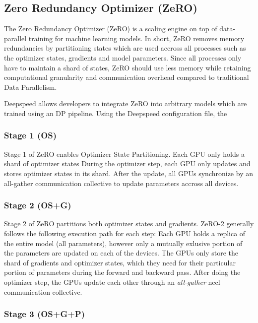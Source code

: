 \subsection{Zero Redundancy Optimizer (ZeRO)}
\label{subsection:zero}

The Zero Redundancy Optimizer (ZeRO) is a scaling engine on top of data-parallel training for 
machine learning models. In short, ZeRO removes memory redundancies by partitioning states which 
are used accross all processes such as the optimizer states, gradients and model parameters. 
Since all processes only have to maintain a shard of states, ZeRO should use less memory while 
retaining computational granularity and communication overhead compared to traditional Data 
Parallelism.

Deepspeed allows developers to integrate ZeRO into arbitrary models which are trained using an 
DP pipeline. Using the Deepspeed configuration file, the 



\subsubsection{Stage 1 (OS)}

Stage 1 of ZeRO enables Optimizer State Partitioning. Each GPU only holds a shard of optimizer states 
During the optimizer step, each GPU only updates and stores optimizer states in its shard. After the 
update, all GPUs synchronize by an all-gather communication collective to update parameters accross 
all devices.

\subsubsection{Stage 2 (OS+G)}

Stage 2 of ZeRO partitions both optimizer states and gradients. ZeRO-2 generally follows the following 
execution path for each step: Each GPU holds a replica of the entire model (all parameters), however 
only a mutually exlusive portion of the parameters are updated on each of the devices. The GPUs only store 
the shard of gradients and optimizer states, which they need for their particular portion of parameters 
during the forward and backward pass. After doing the optimizer step, the GPUs update each other through 
an \textit{all-gather} nccl communication collective. 

\subsubsection{Stage 3 (OS+G+P)}

